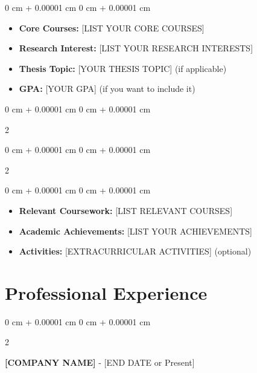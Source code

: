 \documentclass[10pt, a4paper]{article}
\newenvironment{highlights}{
    \begin{itemize}[
        topsep=0.15 cm,
        parsep=0.08 cm,
        partopsep=0pt,
        itemsep=0.05 cm,
        leftmargin=0 cm + 10pt
    ]
}{
    \end{itemize}
} %
\newenvironment{onecolentry}{
    \begin{adjustwidth}{
        0 cm + 0.00001 cm
    }{
        0 cm + 0.00001 cm
    }
}{
    \end{adjustwidth}
} %
\newenvironment{twocolentry}[2][]{
    \onecolentry
    \def\secondColumn{#2}
    \setcolumnwidth{\fill, 4.5 cm}
    \begin{paracol}{2}
}{
    \switchcolumn \raggedleft \secondColumn
    \end{paracol}
    \endonecolentry
} %
\begin{document}
        \vspace{0.10 cm}
        \begin{onecolentry}
            \begin{highlights}
                \item \textbf{Core Courses:} [LIST YOUR CORE COURSES]
                \item \textbf{Research Interest:} [LIST YOUR RESEARCH INTERESTS]
                \item \textbf{Thesis Topic:} [YOUR THESIS TOPIC] (if applicable)
                \item \textbf{GPA:} [YOUR GPA] (if you want to include it)
            \end{highlights}
        \end{onecolentry}

        \vspace{0.2 cm}

        \begin{twocolentry}{
            \bachelorperiod
        }
            \textbf{\bacheloruniversity}\end{twocolentry}

        \begin{twocolentry}{
            \bachelorlocation
        }
            \bachelordegree\end{twocolentry}

        \vspace{0.10 cm}
        \begin{onecolentry}
            \begin{highlights}
                \item \textbf{Relevant Coursework:} [LIST RELEVANT COURSES]
                \item \textbf{Academic Achievements:} [LIST YOUR ACHIEVEMENTS]
                \item \textbf{Activities:} [EXTRACURRICULAR ACTIVITIES] (optional)
            \end{highlights}
        \end{onecolentry}



    
    \section{Professional Experience}

        \begin{twocolentry}{
            [START DATE] - [END DATE or Present]
        }
            \textbf{[COMPANY NAME]}\end{twocolentry}
\end{document}
